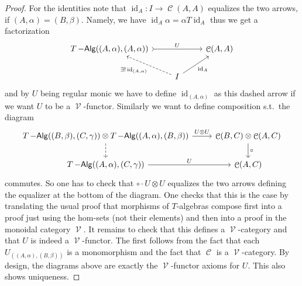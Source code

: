 \documentclass[a4paper,11pt,oneside,openany]{scrbook}
\DeclareMathOperator{\Alg}{-\mathsf{Alg}}
\DeclareMathOperator{\V}{\mathcal{V}}
\DeclareMathOperator{\C}{\mathcal{C}}
\DeclareMathOperator{\id}{id}
\theoremstyle{definition}
\theoremstyle{definition}
\begin{document}
\begin{proof}
For the identities note that $\id_A\colon I\to\C(A,A)$ equalizes the two arrows, if $(A,\alpha)=(B,\beta)$. Namely, we have $\id_A\alpha=\alpha T\id_A$ thus we get a factorization
\[
\begin{tikzcd}
T\Alg((A,\alpha),(A,\alpha)) \arrow[rr, tail, "U"] & & \C(A,A)\\ 
&  I \ar[ul, dashed, "\exists!\id_{(A,\alpha)}"]\ar[ur, "\id_A"']
\end{tikzcd}
\]
and by $U$ being regular monic we have to define $\id_{(A,\alpha)}$ as this dashed arrow if we want $U$ to be a $\V$-functor. Similarly we want to define composition s.t.\ the diagram
\[
 \begin{tikzcd}
        T\Alg((B,\beta),(C,\gamma))\otimes T\Alg((A,\alpha),(B,\beta))\ar[r, "U\otimes U"]\ar[d, dashed]
        & \C(B,C)\otimes\C(A,C)\ar[d, "\circ"] \\
         T\Alg((A,\alpha),(C,\gamma))\ar[r, "U"]
        & \C(A,C)
    \end{tikzcd}
    \]
commutes. So one has to check that $\circ\cdot U\otimes U$ equalizes the two arrows defining the equalizer at the bottom of the diagram. One checks that this is the case by translating the usual proof that morphisms of $T$-algebras compose first into a proof just using the hom-sets (not their elements) and then into a proof in the monoidal category $\V$. It remains to check that this defines a $\V$-category and that $U$ is indeed a $\V$-functor. The first follows from the fact that each $U_{((A,\alpha),(B,\beta))}$ is a monomorphism and the fact that $\C$ is a $\V$-category. By design, the diagrams above are exactly the $\V$-functor axioms for $U$. This also shows uniqueness.
\end{proof}
\end{document}
